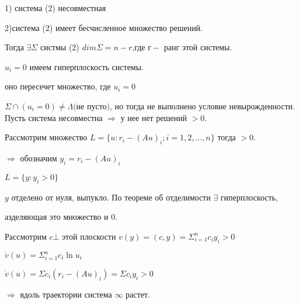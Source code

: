 \begin{center}
1) система (2) несовместная

2)система (2) имеет бесчисленное множество решений.
\end{center}

Тогда $\exists \Sigma$ систмы (2) $ dim \Sigma = n - r $,где  $г - $ ранг этой системы.

\vspace{0.5cm}
$u_i = 0$ имеем гиперплоскость системы.

оно пересечет множество, где $u_i = 0$

$
\Sigma\cap(u_i = 0) \neq\Lambda \textit{(не пусто)}
$, но тогда не выполнено условие невырожденности.
Пусть система несовместна $\Rightarrow$ у нее нет решений $>0$.

Рассмотрим множество $L = \lbrace u : r_i - (Au)_i; i = 1,2,...,n\rbrace$
тогда $>0$.

$\Longrightarrow$ обозначим $y_i = r_i - (Au)_i$

$L = \lbrace y : y_i>0\rbrace$

$y $ отделено от нуля, выпукло. По теореме об отделимости $ \exists $ гиперплоскость, 

азделяющая это множество и 0.

\begin{figure} [h!]
			\caption{}	
\end{figure}

\vspace{0.5cm}
Рассмотрим $ c \bot $ этой плоскости $v(y) = (c,y) = \Sigma_{i=1}^n c_i y_i > 0$

$ \dot{v}(u) = \Sigma_{i=1}^n c_i \ln u_i $

$ \dot{v}(u) = \Sigma c_i(r_i - (Au)_i) = \Sigma c_i y_i > 0 $

$\Rightarrow$ вдоль траектории система $\infty$ растет.






























